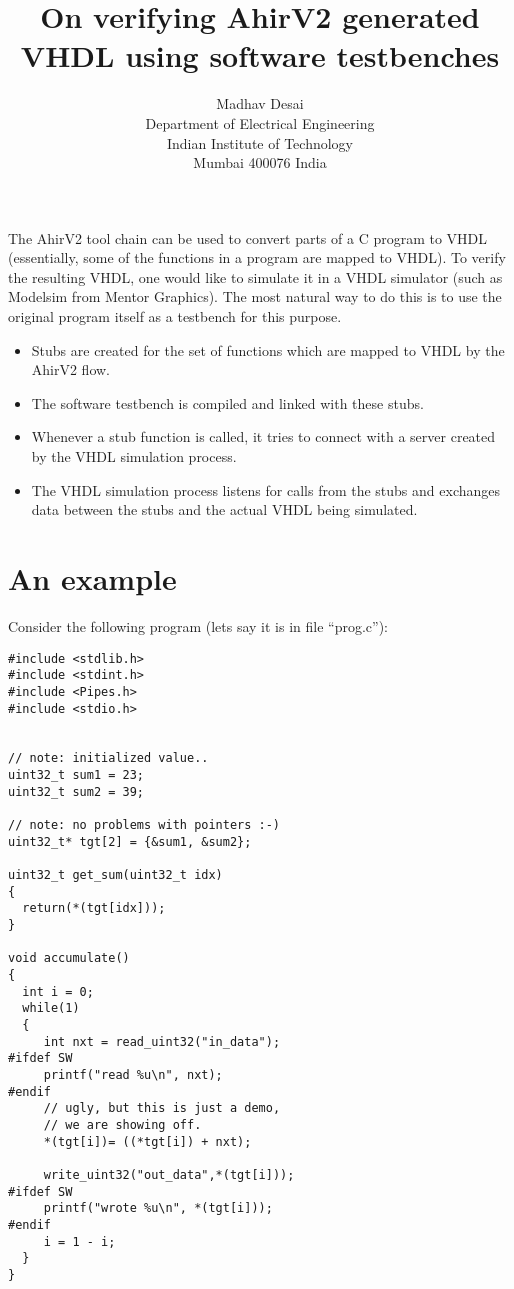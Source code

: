 \documentclass{article}
\title{On verifying AhirV2 generated VHDL using software testbenches}
\author{Madhav Desai \\ Department of Electrical Engineering \\ Indian Institute of Technology \\
	Mumbai 400076 India}
\begin{document}
\maketitle


The AhirV2 tool chain can be used to convert parts of a C program to VHDL
(essentially, some of the functions in a program are mapped to VHDL).
To verify the resulting VHDL, one would like to simulate it in a
VHDL simulator (such as Modelsim from Mentor Graphics).  The most
natural way to do this is to use the original program itself
as a testbench for this purpose.

\begin{itemize}
\item Stubs are created for the set of functions which are mapped to  
VHDL by the AhirV2 flow.
\item The software testbench is compiled and linked with these stubs.
\item Whenever a stub function is called, it tries to connect with
a server created by the VHDL simulation process.
\item The VHDL simulation process listens for calls from the stubs
and exchanges data between the stubs and the actual VHDL being simulated.
\end{itemize}


\section{An example}

Consider the following program (lets say it is in file ``prog.c''):
\begin{verbatim}
#include <stdlib.h>
#include <stdint.h>
#include <Pipes.h>
#include <stdio.h>


// note: initialized value..
uint32_t sum1 = 23;
uint32_t sum2 = 39;

// note: no problems with pointers :-)
uint32_t* tgt[2] = {&sum1, &sum2};

uint32_t get_sum(uint32_t idx)
{
  return(*(tgt[idx]));
}

void accumulate()
{
  int i = 0;
  while(1)
  {
     int nxt = read_uint32("in_data");
#ifdef SW
     printf("read %u\n", nxt);
#endif
     // ugly, but this is just a demo,
     // we are showing off.
     *(tgt[i])= ((*tgt[i]) + nxt);

     write_uint32("out_data",*(tgt[i]));
#ifdef SW
     printf("wrote %u\n", *(tgt[i]));
#endif
     i = 1 - i;
  }
}

\end{verbatim}
\end{document}
